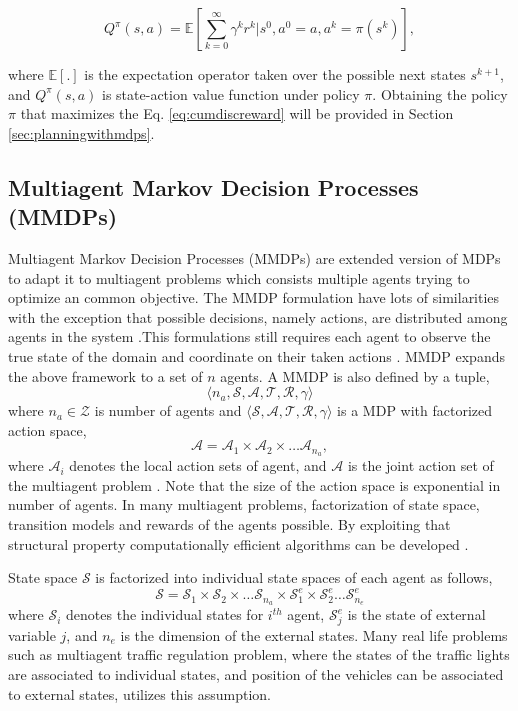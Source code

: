 \documentclass{ituphdreport}
\begin{document}
\begin{equation}
\label{eq:cumdiscreward}
Q^\pi (s,a) = \mathbb{E} \left[ \sum_{k=0}^{\infty}{\gamma^k r^k \vert s^0, a^0 = a, a^k = \pi(s^k)} \right],
\end{equation}

where $\mathbb{E}[.]$ is the expectation operator taken over the possible next states $s^{k+1}$, and $Q^\pi (s,a)$ is state-action value function under policy $\pi$. Obtaining the policy $\pi$ that maximizes the Eq. \ref{eq:cumdiscreward} will be provided in Section \ref{sec:planningwithmdps}. 


\subsection{Multiagent Markov Decision Processes (MMDPs)} \label{sec:mmdp}
Multiagent Markov Decision Processes (MMDPs) are extended version of MDPs to adapt it to multiagent problems which consists multiple agents trying to optimize an common objective. The MMDP formulation have lots of similarities with the exception that possible decisions, namely actions, are distributed among agents in the system \cite{boutilier1999sequential}.This formulations still requires each agent to observe the true state of the domain and coordinate on their taken actions \cite{amato13}. MMDP expands the above framework to a set of $n$ agents. A MMDP is also defined by a tuple,\begin{equation}
\label{eq:mmdptuple}
\langle n_a, \mathcal{S, A, T, R,\gamma \rangle}
\end{equation}
where $n_a\in \mathcal{Z}$ is number of agents and $\mathcal {\langle S, A, T, R,\gamma \rangle}$ is a MDP with factorized action space,
\begin{equation}
\label{eq:factorizedactions}
\mathcal{A} = \mathcal{A}_1 \times \mathcal{A}_2 \times \dots \mathcal{A}_{n_a},
\end{equation}
where $\mathcal{A}_i$ denotes the local action sets of agent, and $\mathcal{A}$ is the joint action set of the multiagent problem \cite{proper2009solving}. Note that the size of the action space is exponential in number of agents. In many multiagent problems, factorization of state space, transition models and rewards of the agents possible. By exploiting that structural property computationally efficient algorithms can be developed \cite{boutilier1999decision}. 

State space $\mathcal{S}$ is factorized into individual state spaces of each agent as follows,
\begin{equation}
\label{eq:factorizedstates}
\mathcal{S} = \mathcal{S}_1 \times \mathcal{S}_2 \times \dots \mathcal{S}_{n_a} 
\times \mathcal{S}^e_1 \times \mathcal{S}^e_2 \ldots \mathcal{S}^e_{n_e}
\end{equation}
where $\mathcal{S}_i$ denotes the individual states for $i^{th}$ agent, $\mathcal{S}^e_j$ is the state of external variable $j$, and $n_e$ is the dimension of the external states. Many real life problems such as multiagent traffic regulation problem, where the states of the traffic lights are associated to individual states, and position of the vehicles can be associated to external states, utilizes this assumption.
\end{document}
